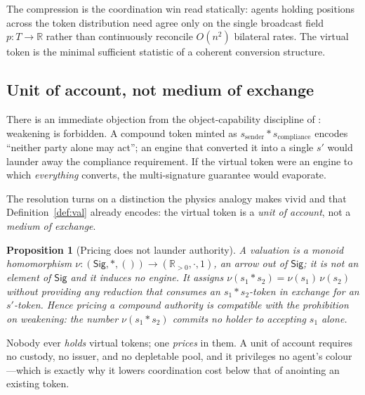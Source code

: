 \documentclass[11pt]{article}
\theoremstyle{definition}
\theoremstyle{plain}
\newtheorem{proposition}[definition]{Proposition}
\theoremstyle{remark}
\newcommand{\Sig}{\mathsf{Sig}}
\newcommand{\Tok}{T}
\newcommand{\Real}{\mathbb{R}}
\newcommand{\Rpos}{\mathbb{R}_{>0}}
\begin{document}
The compression is the coordination win read statically: agents holding positions across the token
distribution need agree only on the single broadcast field $p:\Tok\to\Real$ rather than
continuously reconcile $O(n^2)$ bilateral rates. The virtual token is the minimal sufficient
statistic of a coherent conversion structure.

\subsection*{Unit of account, not medium of exchange}
There is an immediate objection from the object-capability discipline of \cite[\S4.8.5]{CARho}:
weakening is forbidden. A compound token minted as $s_{\text{sender}}\ast s_{\text{compliance}}$
encodes ``neither party alone may act''; an engine that converted it into a single $s'$ would
launder away the compliance requirement. If the virtual token were an engine to which
\emph{everything} converts, the multi-signature guarantee would evaporate.

The resolution turns on a distinction the physics analogy makes vivid and that
Definition~\ref{def:val} already encodes: the virtual token is a \emph{unit of account}, not a
\emph{medium of exchange}.

\begin{proposition}[Pricing does not launder authority]\label{prop:noweaken}
A valuation is a monoid homomorphism $\nu:(\Sig,\ast,())\to(\Rpos,\cdot,1)$, an arrow \emph{out of}
$\Sig$; it is not an element of $\Sig$ and it induces no engine. It assigns
$\nu(s_1\ast s_2)=\nu(s_1)\,\nu(s_2)$ without providing any reduction that consumes an
$s_1\ast s_2$-token in exchange for an $s'$-token. Hence pricing a compound authority is compatible
with the prohibition on weakening: the number $\nu(s_1\ast s_2)$ commits no holder to accepting
$s_1$ alone.
\end{proposition}

Nobody ever \emph{holds} virtual tokens; one \emph{prices} in them. A unit of account requires no
custody, no issuer, and no depletable pool, and it privileges no agent's colour---which is exactly
why it lowers coordination cost below that of anointing an existing token.
\end{document}
